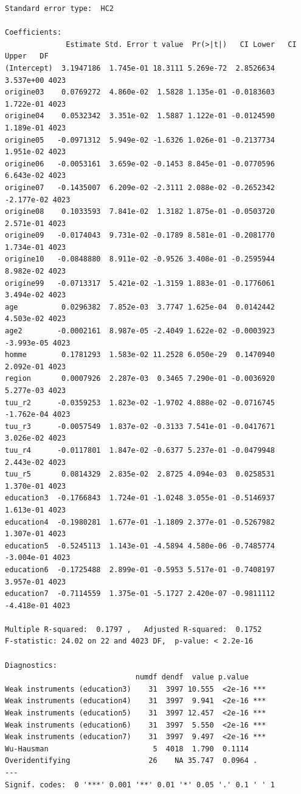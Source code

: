 \documentclass[
  letterpaper,
  DIV=11,
  numbers=noendperiod]{scrartcl}
\begin{document}
\begin{itemize}
\begin{verbatim}
Standard error type:  HC2 

Coefficients:
              Estimate Std. Error t value  Pr(>|t|)   CI Lower   CI Upper   DF
(Intercept)  3.1947186  1.745e-01 18.3111 5.269e-72  2.8526634  3.537e+00 4023
origine03    0.0769272  4.860e-02  1.5828 1.135e-01 -0.0183603  1.722e-01 4023
origine04    0.0532342  3.351e-02  1.5887 1.122e-01 -0.0124590  1.189e-01 4023
origine05   -0.0971312  5.949e-02 -1.6326 1.026e-01 -0.2137734  1.951e-02 4023
origine06   -0.0053161  3.659e-02 -0.1453 8.845e-01 -0.0770596  6.643e-02 4023
origine07   -0.1435007  6.209e-02 -2.3111 2.088e-02 -0.2652342 -2.177e-02 4023
origine08    0.1033593  7.841e-02  1.3182 1.875e-01 -0.0503720  2.571e-01 4023
origine09   -0.0174043  9.731e-02 -0.1789 8.581e-01 -0.2081770  1.734e-01 4023
origine10   -0.0848880  8.911e-02 -0.9526 3.408e-01 -0.2595944  8.982e-02 4023
origine99   -0.0713317  5.421e-02 -1.3159 1.883e-01 -0.1776061  3.494e-02 4023
age          0.0296382  7.852e-03  3.7747 1.625e-04  0.0142442  4.503e-02 4023
age2        -0.0002161  8.987e-05 -2.4049 1.622e-02 -0.0003923 -3.993e-05 4023
homme        0.1781293  1.583e-02 11.2528 6.050e-29  0.1470940  2.092e-01 4023
region       0.0007926  2.287e-03  0.3465 7.290e-01 -0.0036920  5.277e-03 4023
tuu_r2      -0.0359253  1.823e-02 -1.9702 4.888e-02 -0.0716745 -1.762e-04 4023
tuu_r3      -0.0057549  1.837e-02 -0.3133 7.541e-01 -0.0417671  3.026e-02 4023
tuu_r4      -0.0117801  1.847e-02 -0.6377 5.237e-01 -0.0479948  2.443e-02 4023
tuu_r5       0.0814329  2.835e-02  2.8725 4.094e-03  0.0258531  1.370e-01 4023
education3  -0.1766843  1.724e-01 -1.0248 3.055e-01 -0.5146937  1.613e-01 4023
education4  -0.1980281  1.677e-01 -1.1809 2.377e-01 -0.5267982  1.307e-01 4023
education5  -0.5245113  1.143e-01 -4.5894 4.580e-06 -0.7485774 -3.004e-01 4023
education6  -0.1725488  2.899e-01 -0.5953 5.517e-01 -0.7408197  3.957e-01 4023
education7  -0.7114559  1.375e-01 -5.1727 2.420e-07 -0.9811112 -4.418e-01 4023

Multiple R-squared:  0.1797 ,   Adjusted R-squared:  0.1752 
F-statistic: 24.02 on 22 and 4023 DF,  p-value: < 2.2e-16

Diagnostics:
                              numdf dendf  value p.value    
Weak instruments (education3)    31  3997 10.555  <2e-16 ***
Weak instruments (education4)    31  3997  9.941  <2e-16 ***
Weak instruments (education5)    31  3997 12.457  <2e-16 ***
Weak instruments (education6)    31  3997  5.550  <2e-16 ***
Weak instruments (education7)    31  3997  9.497  <2e-16 ***
Wu-Hausman                        5  4018  1.790  0.1114    
Overidentifying                  26    NA 35.747  0.0964 .  
---
Signif. codes:  0 '***' 0.001 '**' 0.01 '*' 0.05 '.' 0.1 ' ' 1
\end{verbatim}
\end{itemize}
\end{document}
